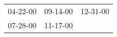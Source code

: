 \begin{supertabular}{lll}
 04-22-00\textsuperscript{} &  09-14-00\textsuperscript{} &  12-31-00\textsuperscript{} \\
 07-28-00\textsuperscript{} &  11-17-00\textsuperscript{} &                             \\
\end{supertabular}
